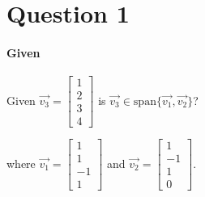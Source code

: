 \documentclass{article}
\begin{document}
    \section{Question 1}
        \paragraph{Given} 
            \begin{center}
                Given
                $\vec{v_3} = \begin{bmatrix}1\\2\\3\\4\end{bmatrix}$
                is 
                $\vec{v_3} \in \text{span}\{\vec{v_1}, \vec{v_2}\}$?
            \end{center}
            \begin{center}
                where
                $\vec{v_1} = \begin{bmatrix}1\\1\\-1\\1\end{bmatrix}$ and
                $\vec{v_2} = \begin{bmatrix}1\\-1\\1\\0\end{bmatrix}$.
            \end{center}
\end{document}
